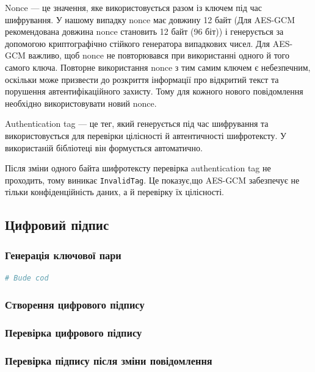 Nonce --- це значення, яке використовується разом із ключем під час шифрування. 
У нашому випадку nonce має довжину 12 байт (Для AES-GCM рекомендована довжина nonce становить 12 байт (96 біт))
і генерується за допомогою криптографічно стійкого генератора випадкових чисел.
Для AES-GCM важливо, щоб nonce не повторювався при використанні одного й того самого ключа. 
Повторне використання nonce з тим самим ключем є небезпечним, оскільки може призвести до розкриття інформації про відкритий текст та порушення автентифікаційного захисту. 
Тому для кожного нового повідомлення необхідно використовувати новий nonce.

Authentication tag --- це тег, який генерується під час шифрування та використовується для 
перевірки цілісності й автентичності шифротексту. У використаній бібліотеці він формується автоматично.

Після зміни одного байта шифротексту перевірка authentication tag не проходить, тому виникає  \texttt{InvalidTag}. 
Це показує,що AES-GCM забезпечує не тільки конфіденційність даних, а й перевірку їх цілісності.

\subsection{Цифровий підпис}

\subsubsection{Генерація ключової пари}


\begin{lstlisting}[language=Python]
# Bude cod 
\end{lstlisting}


\subsubsection{Створення цифрового підпису}


\subsubsection{Перевірка цифрового підпису}


\subsubsection{Перевірка підпису після зміни повідомлення}

